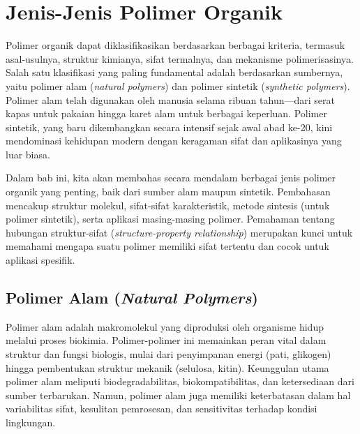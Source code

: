 \documentclass[12pt,a4paper,openany]{book}
\begin{document}

\chapter{Jenis-Jenis Polimer Organik}
\label{chap:jenis-polimer}

Polimer organik dapat diklasifikasikan berdasarkan berbagai kriteria, termasuk asal-usulnya, struktur kimianya, sifat termalnya, dan mekanisme polimerisasinya. Salah satu klasifikasi yang paling fundamental adalah berdasarkan sumbernya, yaitu polimer alam (\textit{natural polymers}) dan polimer sintetik (\textit{synthetic polymers}). Polimer alam telah digunakan oleh manusia selama ribuan tahun---dari serat kapas untuk pakaian hingga karet alam untuk berbagai keperluan. Polimer sintetik, yang baru dikembangkan secara intensif sejak awal abad ke-20, kini mendominasi kehidupan modern dengan keragaman sifat dan aplikasinya yang luar biasa.

Dalam bab ini, kita akan membahas secara mendalam berbagai jenis polimer organik yang penting, baik dari sumber alam maupun sintetik. Pembahasan mencakup struktur molekul, sifat-sifat karakteristik, metode sintesis (untuk polimer sintetik), serta aplikasi masing-masing polimer. Pemahaman tentang hubungan struktur-sifat (\textit{structure-property relationship}) merupakan kunci untuk memahami mengapa suatu polimer memiliki sifat tertentu dan cocok untuk aplikasi spesifik.

\section{Polimer Alam (\textit{Natural Polymers})}
\label{sec:polimer-alam}

Polimer alam adalah makromolekul yang diproduksi oleh organisme hidup melalui proses biokimia. Polimer-polimer ini memainkan peran vital dalam struktur dan fungsi biologis, mulai dari penyimpanan energi (pati, glikogen) hingga pembentukan struktur mekanik (selulosa, kitin). Keunggulan utama polimer alam meliputi biodegradabilitas, biokompatibilitas, dan ketersediaan dari sumber terbarukan. Namun, polimer alam juga memiliki keterbatasan dalam hal variabilitas sifat, kesulitan pemrosesan, dan sensitivitas terhadap kondisi lingkungan.
\end{document}
